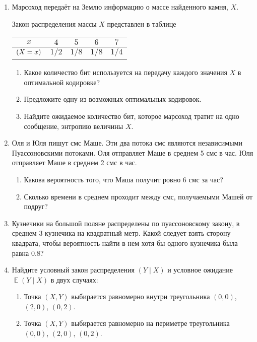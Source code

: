 \documentclass[12pt]{article}
\let\P\relax
\DeclareMathOperator{\P}{\mathbb{P}}
\DeclareMathOperator{\E}{\mathbb{E}}
\begin{document}
\begin{enumerate}[resume]
  \item Марсоход передаёт на Землю информацию о массе найденного камня, $X$. 

  Закон распределения массы $X$ представлен в таблице
  
  \begin{tabular}{*{5}{c}}
  \toprule
  $x$ & $4$ & $5$ & $6$ & $7$ \\
  \midrule
  $\P(X=x)$ & $1/2$ & $1/8$ & $1/8$ & $1/4$ \\
  \bottomrule
  \end{tabular}
    
  \begin{enumerate}
    \item Какое количество бит используется на передачу каждого значения $X$ в оптимальной кодировке?
    \item Предложите одну из возможных оптимальных кодировок.
    \item Найдите ожидаемое количество бит, которое марсоход тратит на одно сообщение, энтропию величины $X$. 
  \end{enumerate}
  
\item Оля и Юля пишут смс Маше.
Эти два потока смс являются независимыми Пуассоновскими потоками.
Оля отправляет Маше в среднем 5 смс в час. 
Юля отправляет Маше в среднем 2 смс в час. 
\begin{enumerate}
  \item Какова вероятность того, что Маша получит ровно 6 смс за час?
  \item Сколько времени в среднем проходит между смс, получаемыми Машей от подруг?
\end{enumerate}


  \item Кузнечики на большой поляне распределены по пуассоновскому закону, 
в среднем 3 кузнечика на квадратный метр. 
Какой следует взять сторону квадрата, чтобы вероятность найти в нем хотя бы одного кузнечика была равна  $0.8$?


\item Найдите условный закон распределения $(Y \mid X)$ и условное ожидание $\E(Y \mid X)$ в двух случаях:
\begin{enumerate}
  \item Точка $(X, Y)$ выбирается равномерно внутри треугольника $(0, 0)$, $(2, 0)$, $(0, 2)$.
  \item Точка $(X, Y)$ выбирается равномерно на периметре треугольника $(0, 0)$, $(2, 0)$, $(0, 2)$.
\end{enumerate}



\end{enumerate}
\end{document}
